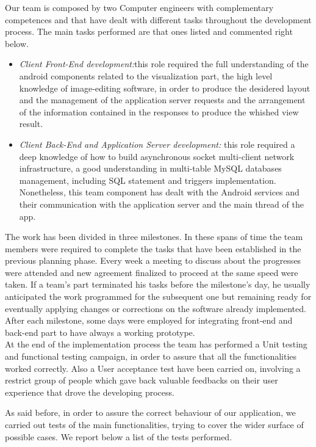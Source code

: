 Our team is composed by two Computer engineers with complementary competences and that have dealt with different tasks throughout the development process. The main tasks performed are that ones listed and commented right below.

\begin{itemize}
\item \emph{Client Front-End development:}this role required the full understanding of the android components related to the visualization part, the high level knowledge of image-editing software, in order to produce the desidered layout and the management of the application server requests and the arrangement of the information contained in the responses to produce the whished view result. 

\item \emph{Client Back-End and Application Server development:} this role required a deep knowledge of how to build asynchronous socket multi-client network infrastructure, a good understanding in multi-table MySQL databases management, including SQL statement and triggers implementation. Nonetheless, this team component has dealt with the Android services and their communication with the application server and the main thread of the app.
\end{itemize}

The work has been divided in three milestones. In these spans of time the team members were required to complete the tasks that have been established in the previous planning phase. Every week a meeting to discuss about the progresses were attended and new agreement finalized to proceed at the same speed were taken. If a team’s part terminated his tasks before the milestone’s day, he usually anticipated the work programmed for the subsequent one but remaining ready for eventually applying changes or corrections on the software already implemented. After each milestone, some days were employed for integrating front-end and back-end part to have always a working prototype. \\
At the end of the implementation process the team has performed a Unit testing and functional testing campaign, in order to assure that all the functionalities worked correctly. Also a User acceptance test have been carried on, involving a restrict group of people which gave back valuable feedbacks on their user experience that drove the developing process.

\newpage
{}
As said before, in order to assure the correct behaviour of our application, we carried out tests of the main functionalities, trying to cover the wider surface of possible cases. We report below a list of the tests performed.

